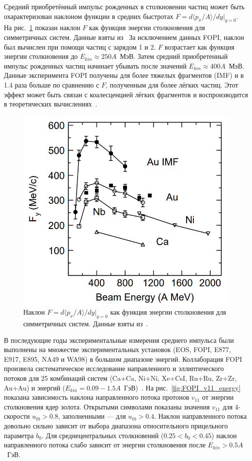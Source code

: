 Средний приобретённый импульс рожденных в столкновении частиц может быть охарактеризован наклоном функции в средних быстротах $F=d\langle p_x /A \rangle / dy|_{y=0}$.
На рис.~\ref{fig:F_pball} показан наклон $F$ как функция энергии столкновения для симметричных систем. 
Данные взяты из~\cite{Gutbrod:1989wd, EOS:1994kku, EOS:1996kon, FOPI:2011aa}
За исключением данных FOPI, наклон был вычислен при помощи частиц с зарядом 1 и 2.
$F$ возрастает как функция энергии столкновения до $E_{kin} \approx 250A$~МэВ.
Затем средний приобретенный импульс рожденных частиц начинает убывать после значений $E_{kin} \approx 400A$~МэВ.
Данные эксперимента FOPI получены для более тяжелых фрагментов (IMF) и в 1.4 раза больше по сравнению с $F$, полученным для более лёгких частиц. 
Этот эффект может быть связан с коалесценцией лёгких фрагментов и воспроизводится в теоретических вычислениях~\cite{EOS:1994jzn}.
%
\begin{figure}
    \centering
    \includegraphics[width=0.55\linewidth]{images/F_energy.png}
    \caption{Наклон $F=d\langle p_x /A \rangle / dy|_{y=0}$ как функция энергии столкновения для симметричных систем. Данные взяты из~\cite{Gutbrod:1989wd, EOS:1994kku, EOS:1996kon, FOPI:2011aa}.}
    \label{fig:F_pball}
\end{figure}

В последующие годы экспериментальные измерения среднего импульса были выполнены на множестве экспериментальных установок (EOS, FOPI, E877, E917, E895, NA49 и WA98) в большом диапазоне энергий.
Коллаборация FOPI произвела систематическое исследование направленного и эллиптического потоков для 25 комбинаций систем (Ca+Ca, Ni+Ni, Xe+CsI, Ru+Ru, Zr+Zr, Au+Au) и энергий ($E_{kin}=0.09-1.5A$~ГэВ)~\cite{FOPI:2011aa}. 
На рис.~\ref{fig:FOPI_v11_energy} показана зависимость наклона направленного потока протонов $v_{11}$ от энергии столкновения ядер золота. 
Открытыми символами показаны значения $v_{11}$ для 4-скорости $u_{t0}>0.8$, заполненными --- для $u_{t0}>0.4$.
Наклон направленного потока довольно сильно зависит от выбора диапазона относительного прицельного параметра $b_0$.
Для среднецентральных столкновений ($0.25<b_0<0.45$) наклон направленного потока слабо зависит от энергии столкновения после $E_{kin}>0.5A$~ГэВ.


